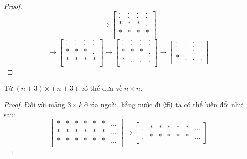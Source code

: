 \documentclass[11pt]{scrartcl}
\begin{document}
\begin{itemize}[label=, leftmargin=0em, itemsep=0.5em]
\begin{sol}
\begin{proof}
\[        \to 
        \begin{bmatrix}
            . & . & .&.\\
            . & . & .&.\\
            * & * & *&.\\
            * & * & *&*\\
        \end{bmatrix}
        \]
        \[
        \to 
        \begin{bmatrix}
            . & . & .&.\\
            . & . & .&.\\
            * & * & *&.\\
            * & * & *&*\\
        \end{bmatrix}
        \to 
        \begin{bmatrix}
            . & . & .&.\\
            . & . & .&.\\
            * & * & *&.\\
            * & . & .&.\\
        \end{bmatrix}
        \to 
        \begin{bmatrix}
            . & . & .&.\\
            . & . & .&.\\
            . & . & .&.\\
            * & . & .&.\\
        \end{bmatrix}
        \]
        \end{proof}
         Từ $(n + 3)\times (n + 3)$ có thể đưa về $n \times n$.
        \begin{proof}
            Đối với mảng $3 \times k$ ở rìa ngoài, bằng nước đi $(\fa)$ ta có thể biến đổi như sau: 
            \[
                \begin{bmatrix}
                    * & * & *&*&*&*&...\\
                    * & * & *&*&*&*&...\\
                    * & * & *&*&*&*&...\\
                \end{bmatrix}
            \to 
                \begin{bmatrix}
                    . & * & *&*&*&*&...\\
                    . & * & *&*&*&*&...\\

\end{bmatrix}\]
\end{proof}
\end{sol}
\end{itemize}
\end{document}
